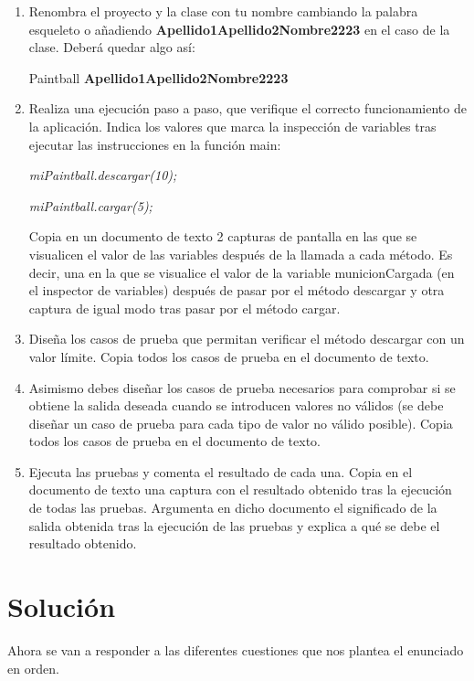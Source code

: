 \begin{enumerate}
    \item Renombra el proyecto y la clase con tu nombre cambiando la palabra esqueleto o añadiendo \textbf{Apellido1Apellido2Nombre2223} en el caso de la clase. Deberá quedar algo así:

    Paintball \textbf{Apellido1Apellido2Nombre2223}

    \item Realiza una ejecución paso a paso, que verifique el correcto funcionamiento de la aplicación. Indica los valores que marca la inspección de variables tras ejecutar las instrucciones en la función main:

    \textit{miPaintball.descargar(10);}

    \textit{miPaintball.cargar(5);}

    Copia en un documento de texto 2 capturas de pantalla en las que se visualicen el valor de las variables después de la llamada a cada método. Es decir, una en la que se visualice el valor de la variable municionCargada (en el inspector de variables) después de pasar por el método descargar y otra captura de igual modo tras pasar por el método cargar.

    \item Diseña los casos de prueba que permitan verificar el método descargar con un valor límite. Copia todos los casos de prueba en el documento de texto.

    \item Asimismo debes diseñar los casos de prueba necesarios para comprobar si se obtiene la salida deseada cuando se introducen valores no válidos (se debe diseñar un caso de prueba para cada tipo de valor no válido posible). Copia todos los casos de prueba en el documento de texto.

    \item Ejecuta las pruebas y comenta el resultado de cada una. Copia en el documento de texto una captura con el resultado obtenido tras la ejecución de todas las pruebas. Argumenta en dicho documento el significado de la salida obtenida tras la ejecución de las pruebas y explica a qué se debe el resultado obtenido.
\end{enumerate}

\section{Solución}
Ahora se van a responder a las diferentes cuestiones que nos plantea el enunciado en orden.


